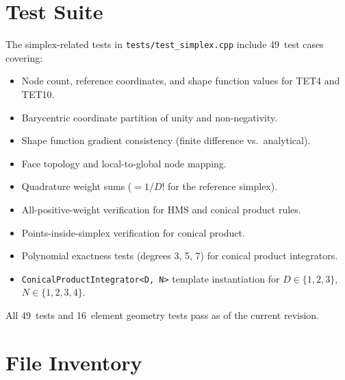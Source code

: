 \section{Test Suite}
\label{sec:tests}

The simplex-related tests in \texttt{tests/test\_simplex.cpp} include 49~test
cases covering:
\begin{itemize}[nosep]
  \item Node count, reference coordinates, and shape function values for
        TET4 and TET10.
  \item Barycentric coordinate partition of unity and non-negativity.
  \item Shape function gradient consistency (finite difference vs.\ analytical).
  \item Face topology and local-to-global node mapping.
  \item Quadrature weight sums ($= 1/D!$ for the reference simplex).
  \item All-positive-weight verification for HMS and conical product rules.
  \item Points-inside-simplex verification for conical product.
  \item Polynomial exactness tests (degrees 3, 5, 7) for conical product
        integrators.
  \item \texttt{ConicalProductIntegrator<D, N>} template instantiation for
        $D \in \{1, 2, 3\}$, $N \in \{1, 2, 3, 4\}$.
\end{itemize}

All 49~tests and 16~element geometry tests pass as of the current revision.


\section{File Inventory}
\label{sec:file_inventory}

